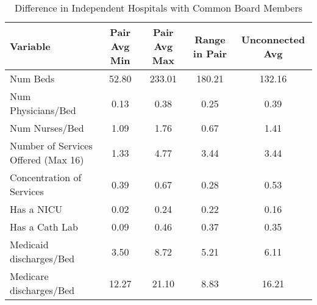 \begin{table}[ht!]
\centering
\caption{Difference in Independent Hospitals with Common Board Members}
\centering
\begin{tabular}[t]{lcccc}
\toprule
Variable & Pair Avg Min & Pair Avg Max & Range in Pair & Unconnected Avg\\
\midrule
Num Beds & 52.80 & 233.01 & 180.21 & 132.16\\
Num Physicians/Bed & 0.13 & 0.38 & 0.25 & 0.39\\
Num Nurses/Bed & 1.09 & 1.76 & 0.67 & 1.41\\
Number of Services Offered (Max 16) & 1.33 & 4.77 & 3.44 & 3.44\\
Concentration of Services & 0.39 & 0.67 & 0.28 & 0.53\\
\addlinespace
Has a NICU & 0.02 & 0.24 & 0.22 & 0.16\\
Has a Cath Lab & 0.09 & 0.46 & 0.37 & 0.35\\
Medicaid discharges/Bed & 3.50 & 8.72 & 5.21 & 6.11\\
Medicare discharges/Bed & 12.27 & 21.10 & 8.83 & 16.21\\
\bottomrule
\end{tabular}
\end{table}
